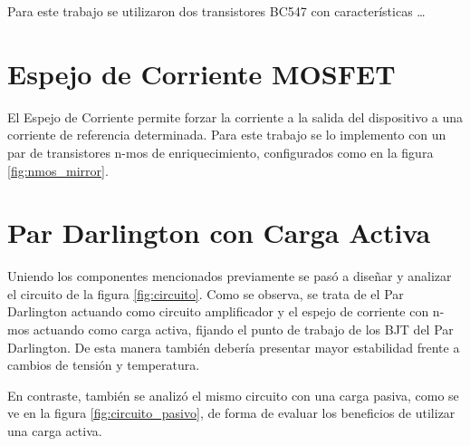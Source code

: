 Para este trabajo se utilizaron dos transistores BC547 con características \dots

\section{Espejo de Corriente MOSFET}

El Espejo de Corriente permite forzar la corriente a la salida del dispositivo a una corriente de referencia determinada. Para este trabajo se lo implemento con un par de transistores n-mos de enriquecimiento, configurados como en la figura \ref{fig:nmos_mirror}.

\section{Par Darlington con Carga Activa}
Uniendo los componentes mencionados previamente se pasó a diseñar y analizar el circuito de la figura \ref{fig:circuito}. Como se observa, se trata de el Par Darlington actuando como circuito amplificador y el espejo de corriente con n-mos actuando como carga activa, fijando el punto de trabajo de los BJT del Par Darlington. De esta manera también debería presentar mayor estabilidad frente a cambios de tensión y temperatura.

En contraste, también se analizó el mismo circuito con una carga pasiva, como se ve en la figura \ref{fig:circuito_pasivo}, de forma de evaluar los beneficios de utilizar una carga activa.


